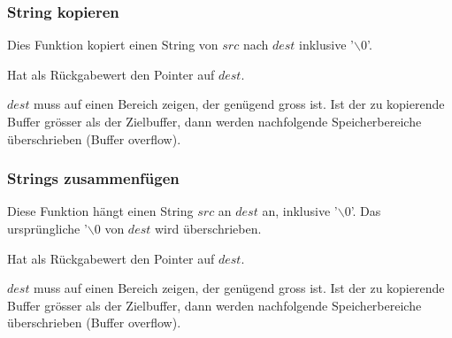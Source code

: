 		\begin{minipage}[t]{9 cm}
			\subsubsection{String kopieren }
				
				\begin{compactitem}
					\item Dies Funktion kopiert einen String von $src$ nach $dest$ inklusive '$\backslash0$'.
					\item Hat als Rückgabewert den Pointer auf $dest$.
					\item $dest$ muss auf einen Bereich zeigen, der genügend gross ist. Ist der zu kopierende Buffer grösser als der Zielbuffer, dann werden	nachfolgende Speicherbereiche überschrieben (Buffer overflow).
				\end{compactitem}
				
			\subsubsection{Strings zusammenfügen }
				
				\begin{compactitem}
					\item Diese Funktion hängt einen String $src$ an $dest$ an, inklusive '$\backslash0$'. Das ursprüngliche '$\backslash0$ von $dest$ wird überschrieben.
					\item Hat als Rückgabewert den Pointer auf $dest$.
					\item $dest$ muss auf einen Bereich zeigen, der genügend gross ist. Ist der zu kopierende Buffer grösser als der Zielbuffer, dann werden	nachfolgende Speicherbereiche überschrieben (Buffer overflow).
				\end{compactitem}
		\end{minipage}
		\hspace*{0.5cm}
